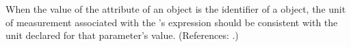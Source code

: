 When the value of the attribute  of an \EventAssignment
object is the identifier of a \Parameter object, the unit of measurement
associated with the \EventAssignment's  expression should be
consistent with the unit declared for that parameter's value.  (References:
.)
